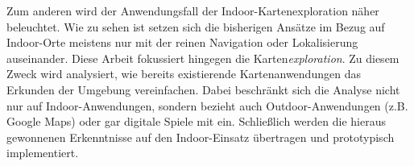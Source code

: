 Zum anderen wird der Anwendungsfall der Indoor-Kartenexploration näher beleuchtet.
Wie zu sehen ist setzen sich die bisherigen Ansätze im Bezug auf Indoor-Orte meistens nur mit der reinen Navigation oder Lokalisierung auseinander.
Diese Arbeit fokussiert hingegen die Karten\emph{exploration}.
Zu diesem Zweck wird analysiert, wie bereits existierende Kartenanwendungen das Erkunden der Umgebung vereinfachen.
Dabei beschränkt sich die Analyse nicht nur auf Indoor-Anwendungen, sondern bezieht auch Outdoor-Anwendungen (z.B. Google Maps) oder gar digitale Spiele mit ein.
Schließlich werden die hieraus gewonnenen Erkenntnisse auf den Indoor-Einsatz übertragen und prototypisch implementiert.
%
\cleardoublepage
